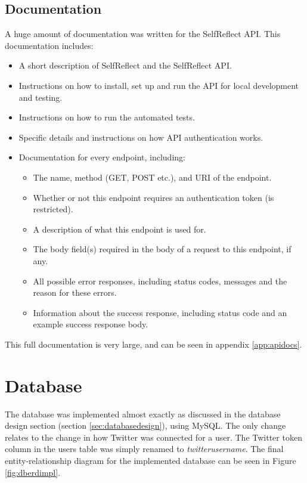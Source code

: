\documentclass[11pt,openright,a4paper]{report}
\begin{document}
\subsection{Documentation} \label{sec:apidocs}
A huge amount of documentation was written for the SelfReflect API. This documentation includes:
\begin{itemize}
\item A short description of SelfReflect and the SelfReflect API.
\item Instructions on how to install, set up and run the API for local development and testing.
\item Instructions on how to run the automated tests.
\item Specific details and instructions on how API authentication works.
\item Documentation for every endpoint, including:
  \begin{itemize}
  \item The name, method (GET, POST etc.), and URI of the endpoint.
  \item Whether or not this endpoint requires an authentication token (is restricted).
  \item A description of what this endpoint is used for.
  \item The body field(s) required in the body of a request to this endpoint, if any.
  \item All possible error responses, including status codes, messages and the reason for these errors.
  \item Information about the success response, including status code and an example success response body.
  \end{itemize}
\end{itemize}

This full documentation is very large, and can be seen in appendix \ref{app:apidocs}.

\section{Database}
The database was implemented almost exactly as discussed in the database design section (section \ref{sec:databasedesign}), using MySQL. The only change relates to the change in how Twitter was connected for a user. The Twitter token column in the users table was simply renamed to \emph{twitter\textunderscore username}. The final entity-relationship diagram for the implemented database can be seen in Figure \ref{fig:dberdimpl}.
\end{document}
